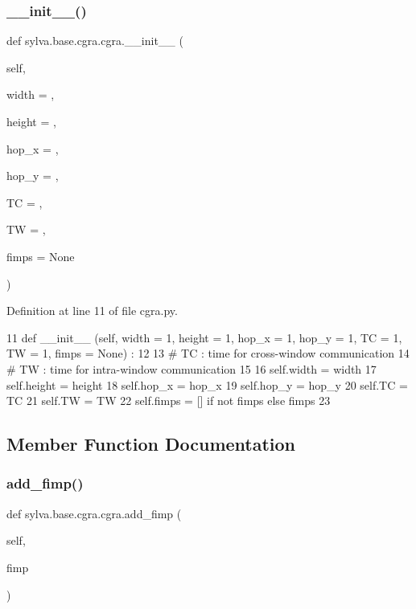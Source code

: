 \subsubsection{\texorpdfstring{\+\_\+\+\_\+init\+\_\+\+\_\+()}{\_\_init\_\_()}}
{\footnotesize\ttfamily def sylva.\+base.\+cgra.\+cgra.\+\_\+\+\_\+init\+\_\+\+\_\+ (\begin{DoxyParamCaption}\item[{}]{self,  }\item[{}]{width = {},  }\item[{}]{height = {},  }\item[{}]{hop\+\_\+x = {},  }\item[{}]{hop\+\_\+y = {},  }\item[{}]{TC = {},  }\item[{}]{TW = {},  }\item[{}]{fimps = {\ttfamily None} }\end{DoxyParamCaption})}



Definition at line 11 of file cgra.\+py.


\begin{DoxyCode}
11   \textcolor{keyword}{def }\_\_init\_\_ (self, width = 1, height = 1, hop\_x = 1, hop\_y = 1, TC = 1, TW = 1, fimps = None) :
12 
13     \textcolor{comment}{# TC : time for cross-window communication}
14     \textcolor{comment}{# TW : time for intra-window communication}
15 
16     self.width = width
17     self.height = height
18     self.hop\_x = hop\_x
19     self.hop\_y = hop\_y
20     self.TC = TC
21     self.TW = TW
22     self.fimps = [] \textcolor{keywordflow}{if} \textcolor{keywordflow}{not} fimps \textcolor{keywordflow}{else} fimps
23 
\end{DoxyCode}


\subsection{Member Function Documentation}
\mbox{\label{classsylva_1_1base_1_1cgra_1_1cgra_a8bb04d75e7980772981822aab2966637}} 
\subsubsection{\texorpdfstring{add\+\_\+fimp()}{add\_fimp()}}
{\footnotesize\ttfamily def sylva.\+base.\+cgra.\+cgra.\+add\+\_\+fimp (\begin{DoxyParamCaption}\item[{}]{self,  }\item[{}]{fimp }\end{DoxyParamCaption})}



